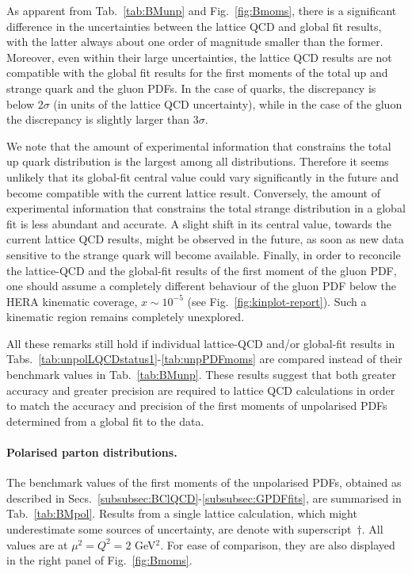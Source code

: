 As apparent from Tab.~\ref{tab:BMunp} and Fig.~\ref{fig:Bmoms}, there is a 
significant difference in the uncertainties between the lattice QCD and 
global fit results, with the latter always about one order of magnitude 
smaller than the former.
%
Moreover, even within their large uncertainties, the lattice QCD results are 
not compatible with the global fit results for the first moments of the 
total up and strange quark and the gluon PDFs.
%
In the case of quarks, the discrepancy is below 2$\sigma$ (in units of the 
lattice QCD uncertainty), while in the case of the gluon the discrepancy is
slightly larger than 3$\sigma$.

We note that the amount of experimental information that constrains the
total up quark distribution is the largest among all distributions.
%
Therefore it seems unlikely that its global-fit central value could vary 
significantly in the future and become compatible with the current
lattice result.
%
Conversely, the amount of experimental information that constrains the
total strange distribution in a global fit is less abundant and accurate.
%
A slight shift in its central value, towards the current lattice QCD results,
might be observed in the future, as soon as new data sensitive to the strange 
quark will become available.
%
Finally, in order to reconcile the lattice-QCD and the global-fit results
of the first moment of the gluon PDF, one should assume a completely
different behaviour of the gluon PDF below the HERA kinematic
coverage, $x\sim10^{-5}$ (see Fig.~\ref{fig:kinplot-report}).
%
Such a kinematic region remains completely unexplored.

All these remarks still hold if individual lattice-QCD and/or global-fit
results in Tabs.~\ref{tab:unpolLQCDstatus1}-\ref{tab:unpPDFmoms} are 
compared instead of their benchmark values in Tab.~\ref{tab:BMunp}. 
%
These results suggest that both greater accuracy and greater precision are
required to lattice QCD calculations in order to match the accuracy and 
precision of the first moments of unpolarised PDFs determined from a global
fit to the data.

\paragraph{Polarised parton distributions.}
%
%
The benchmark values of the first moments of the unpolarised PDFs, obtained
as described in Secs.~\ref{subsubsec:BClQCD}-\ref{subsubsec:GPDFfits}, 
are summarised in Tab.~\ref{tab:BMpol}.
%
Results from a single lattice calculation, which might underestimate some 
sources of uncertainty, are denote with superscript~$\dagger$.
%
All values are at $\mu^2=Q^2=2$ GeV$^2$.
%
For ease of comparison, they are also displayed in 
the right panel of Fig.~\ref{fig:Bmoms}.

